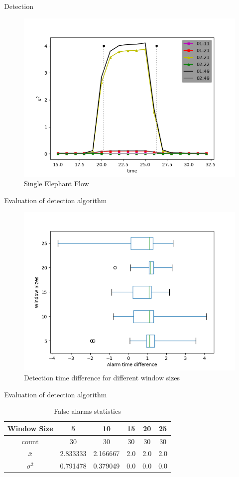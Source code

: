 \documentclass{beamer}
\begin{document}
\begin{frame}{Detection}
    \begin{figure}
        \includegraphics[width=.9\textwidth]{meter_eleph/single_elephant_flow}
        \caption{Single Elephant Flow}
    \end{figure}
\end{frame}

\begin{frame}{Evaluation of detection algorithm}
    \begin{figure}
        \includegraphics[width=.7\textwidth]{meter_eleph/time_error}
        \caption{Detection time difference for different window sizes}
    \end{figure}
\end{frame}

\begin{frame}{Evaluation of detection algorithm}
    \begin{table}[]
        \centering
        \caption{False alarms statistics}
        \label{tab:false_alarms}
        \begin{tabular}{|c|c|c|c|c|c|}
            \hline
            Window Size   & 5        & 10       & 15  & 20  & 25  \\ \hline
            count         & 30       & 30       & 30  & 30  & 30  \\ \hline
            $\bar{x}$            & 2.833333 & 2.166667 & 2.0 & 2.0 & 2.0 \\ \hline
            $\sigma^2$& 0.791478 & 0.379049 & 0.0 & 0.0 & 0.0 \\ \hline
        \end{tabular}
    \end{table}
\end{frame}
\end{document}
